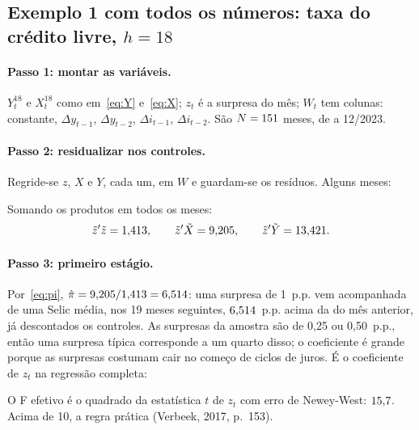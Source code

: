 \subsection{Exemplo 1 com todos os números: taxa do crédito livre, $h=18$}

\paragraph{Passo 1: montar as variáveis.} $Y^{18}_t$ e $X^{18}_t$ como em~\eqref{eq:Y}
e~\eqref{eq:X}; $z_t$ é a surpresa do mês; $W_t$ tem \KwTL{} colunas: constante, $\Delta y_{t-1}$,
$\Delta y_{t-2}$, $\Delta i_{t-1}$, $\Delta i_{t-2}$. São $N=151$ meses, de \IniTL{} a 12/2023.

\paragraph{Passo 2: residualizar nos controles.} Regride-se $z$, $X$ e $Y$, cada um, em $W$ e
guardam-se os resíduos. Alguns meses:
\begin{table}[H]\centering\small
\caption{Variáveis residualizadas nos controles (taxa do crédito livre)}

\end{table}
Somando os produtos em todos os \NTL{} meses:
\[
\tilde z'\tilde z = 1{,}413,\qquad \tilde z'\tilde X = 9{,}205,\qquad \tilde z'\tilde Y = 13{,}421.
\]

\paragraph{Passo 3: primeiro estágio.} Por~\eqref{eq:pi}, $\hat\pi=9{,}205/1{,}413=6{,}514$: uma surpresa
de 1~p.p. vem acompanhada de uma Selic média, nos 19 meses seguintes, $6{,}514$~p.p. acima da do
mês anterior, já descontados os controles. As surpresas da amostra são de 0,25 ou 0,50~p.p., então
uma surpresa típica corresponde a um quarto disso; o coeficiente é grande porque as surpresas
costumam cair no começo de ciclos de juros. É o coeficiente de $z_t$ na regressão completa:
\begin{table}[H]\centering\small
\caption{Primeiro estágio, equação~\eqref{eq:fs}: $X^{18}_t$ na surpresa e nos controles}

\end{table}
O F efetivo é o quadrado da estatística $t$ de $z_t$ com erro de Newey-West: $15{,}7$. Acima de 10,
a regra prática (Verbeek, 2017, p.~153).

